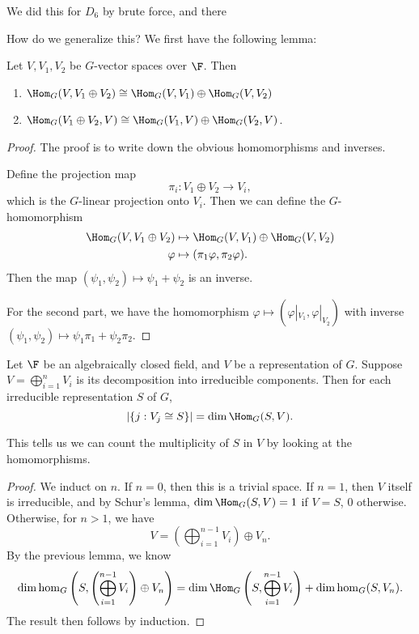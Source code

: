 \documentclass[a4paper]{article}
\begin{document}
We did this for $D_6$ by brute force, and there

How do we generalize this? We first have the following lemma:
\begin{lemma}
  Let $V, V_1, V_2$ be $G$-vector spaces over $\F$. Then
  \begin{enumerate}
    \item $\Hom_G(V, V_1 \oplus V_2) \cong \Hom_G(V, V_1) \oplus \Hom_G(V, V_2)$
    \item $\Hom_G(V_1 \oplus V_2, V) \cong \Hom_G(V_1, V) \oplus \Hom_G(V_2, V)$.
  \end{enumerate}
\end{lemma}

\begin{proof}
  The proof is to write down the obvious homomorphisms and inverses.

  Define the projection map
  \[
    \pi_i: V_1 \oplus V_2 \to V_i,
  \]
  which is the $G$-linear projection onto $V_i$. Then we can define the $G$-homomorphism
  \begin{align*}
    \Hom_G (V, V_1 \oplus V_2) &\mapsto \Hom_G(V, V_1) \oplus \Hom_G(V, V_2)\\
    \varphi &\mapsto (\pi_1 \varphi, \pi_2 \varphi).
  \end{align*}
  Then the map $(\psi_1, \psi_2) \mapsto \psi_1 + \psi_2$ is an inverse.

  For the second part, we have the homomorphism $\varphi \mapsto (\varphi|_{V_1}, \varphi|_{V_2})$ with inverse $(\psi_1, \psi_2) \mapsto \psi_1 \pi_1 + \psi_2 \pi_2$.
\end{proof}

\begin{lemma}
  Let $\F$ be an algebraically closed field, and $V$ be a representation of $G$. Suppose $V = \bigoplus_{i = 1}^n V_i$ is its decomposition into irreducible components. Then for each irreducible representation $S$ of $G$,
  \[
    |\{j: V_j \cong S\}| = \dim \Hom_G(S, V).
  \]
\end{lemma}
This tells us we can count the multiplicity of $S$ in $V$ by looking at the homomorphisms.

\begin{proof}
  We induct on $n$. If $n = 0$, then this is a trivial space. If $n = 1$, then $V$ itself is irreducible, and by Schur's lemma, $\dim \Hom_G(S, V) = 1$ if $V = S$, $0$ otherwise. Otherwise, for $n > 1$, we have
  \[
    V = \left(\bigoplus_{i = 1}^{n - 1} V_i\right) \oplus V_n.
  \]
  By the previous lemma, we know
  \[
    \dim \hom_G\left(S, \left(\bigoplus_{i = 1}^{n - 1} V_i\right) \oplus V_n\right) = \dim \Hom_G\left(S, \bigoplus_{i = 1}^{n - 1} V_i\right) + \dim \hom_G(S, V_n).
  \]
  The result then follows by induction.
\end{proof}
\end{document}
